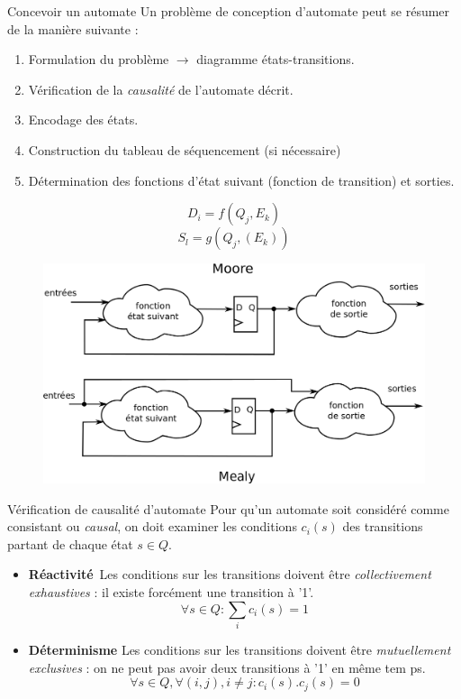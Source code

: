 \documentclass[xcolor=table]{beamer}
\begin{document}
\begin{frame}{Concevoir un automate}
  Un problème de conception d'automate peut se résumer de la manière suivante :
  \begin{enumerate}
    \item Formulation du problème $\rightarrow$ diagramme états-transitions.
    \item Vérification de la {\it causalité} de l'automate décrit.
    \item Encodage des états.
    \item Construction du tableau de séquencement (si nécessaire)
    \item Détermination des fonctions d'état suivant (fonction de transition) et sorties.
  \end{enumerate}
  $$ D_i=f(Q_j,E_k) $$
  $$ S_l=g(Q_j,(E_k)) $$

  \begin{figure}[h!]
    \centering
    \includegraphics[scale=0.13]{../../POLY/figures/moore_mealy.png}
    \label{fig:mealy_moore}
  \end{figure}
\end{frame}

\begin{frame}{Vérification de causalité d'automate}
  Pour qu'un automate soit considéré comme consistant ou {\it causal}, on doit examiner les conditions $c_i(s)$ des transitions
  partant de chaque état $s\in Q$.
  \begin{itemize}
  \item \textbf{Réactivité} Les conditions sur les transitions doivent être {\it collectivement exhaustives} : il existe forcément une transition à '1'.
  $$\forall s \in Q : \sum_i c_i(s)=1$$
  \item \textbf{Déterminisme} Les conditions sur les transitions doivent être {\it mutuellement exclusives} : on ne peut pas avoir deux transitions à '1' en même tem
  ps.
  $$\forall s \in Q, \forall (i,j), i\neq j : c_i(s).c_j(s)=0$$
  \end{itemize}
\end{frame}
\end{document}
